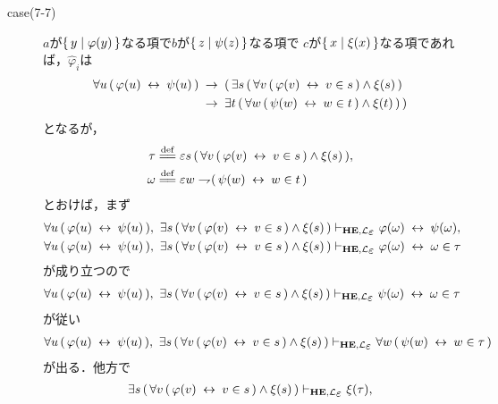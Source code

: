 \begin{metaprf}
\begin{description}
\begin{description}
					\item[case(7-7)] $a$が$\{\, y \mid \varphi(y)\, \}$なる項で$b$が$\{\, z \mid \psi(z)\, \}$なる項で
						$c$が$\{\, x \mid \xi(x)\, \}$なる項であれば，$\widehat{\varphi}_{i}$は
						\begin{align}
							\forall u\, (\, \varphi(u) \hspace{0.25em}\leftrightarrow\hspace{0.25em} \psi(u)\, ) 
							&\hspace{0.25em}\rightarrow\hspace{0.25em} (\, \exists s\, (\, \forall v\, (\, \varphi(v) \hspace{0.25em}\leftrightarrow\hspace{0.25em} v \in s\, ) \wedge \xi(s)\, ) \\
							&\hspace{0.25em}\rightarrow\hspace{0.25em} \exists t\, (\, \forall w\, (\, \psi(w) \hspace{0.25em}\leftrightarrow\hspace{0.25em} w \in t\, ) \wedge \xi(t)\, )\, )
						\end{align}
						となるが，
						\begin{align}
							\tau &\defeq \varepsilon s\, (\, \forall v\, (\, \varphi(v) \lrarrow v \in s\, ) \wedge \xi(s)\, ), \\
							\omega &\defeq \varepsilon w \negation (\, \psi(w) \lrarrow w \in t\, )
						\end{align}
						とおけば，まず
						\begin{align}
							\forall u\, (\, \varphi(u) \lrarrow \psi(u)\, ),\ 
							\exists s\, (\, \forall v\, (\, \varphi(v) \lrarrow v \in s\, ) \wedge \xi(s)\, )
							&\provable{\mbox{{\bf HE}},\lang{\varepsilon}} \varphi(\omega) \lrarrow \psi(\omega), \\
							\forall u\, (\, \varphi(u) \lrarrow \psi(u)\, ),\ 
							\exists s\, (\, \forall v\, (\, \varphi(v) \lrarrow v \in s\, ) \wedge \xi(s)\, )
							&\provable{\mbox{{\bf HE}},\lang{\varepsilon}} \varphi(\omega) \lrarrow \omega \in \tau
						\end{align}
						が成り立つので
						\begin{align}
							\forall u\, (\, \varphi(u) \lrarrow \psi(u)\, ),\ 
							\exists s\, (\, \forall v\, (\, \varphi(v) \lrarrow v \in s\, ) \wedge \xi(s)\, )
							\provable{\mbox{{\bf HE}},\lang{\varepsilon}} \psi(\omega) \lrarrow \omega \in \tau
						\end{align}
						が従い
						\begin{align}
							\forall u\, (\, \varphi(u) \lrarrow \psi(u)\, ),\ 
							\exists s\, (\, \forall v\, (\, \varphi(v) \lrarrow v \in s\, ) \wedge \xi(s)\, )
							\provable{\mbox{{\bf HE}},\lang{\varepsilon}} \forall w\, (\, \psi(w) \lrarrow w \in \tau\, )
						\end{align}
						が出る．他方で
						\begin{align}
							\exists s\, (\, \forall v\, (\, \varphi(v) \lrarrow v \in s\, ) \wedge \xi(s)\, )
							\provable{\mbox{{\bf HE}},\lang{\varepsilon}} \xi(\tau), \\

\end{align}
\end{description}
\end{description}
\end{metaprf}

